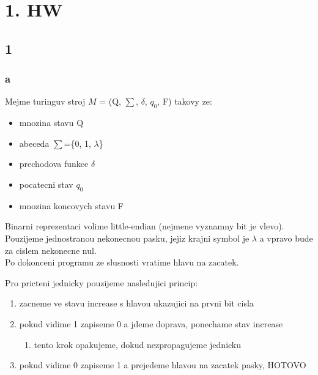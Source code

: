 \documentclass[a4paper]{article}
\begin{document}
\pagestyle{fancy}

\section*{1. HW}
\subsection*{1}
\subsubsection*{a}
Mejme turinguv stroj $M$ = (Q, $\sum$, $\delta$, $q_0$, F) takovy ze:
\begin{itemize}
    \item mnozina stavu Q
    \item abeceda $\sum$=\{0, 1, $\lambda$\}
    \item prechodova funkce $\delta$
    \item pocatecni stav $q_0$
    \item mnozina koncovych stavu F
\end{itemize}

Binarni reprezentaci volime little-endian (nejmene vyznamny bit je vlevo).\\
Pouzijeme jednostranou nekonecnou pasku, jejiz krajni symbol je $\lambda$ a vpravo bude za cislem nekonecne nul.\\
Po dokonceni programu ze slusnosti vratime hlavu na zacatek.

Pro pricteni jednicky pouzijeme nasledujici princip:
\begin{enumerate}
    \item zacneme ve stavu increase s hlavou ukazujici na prvni bit cisla
    \item pokud vidime 1 zapiseme 0 a jdeme doprava, ponechame stav increase
    \begin{enumerate}
        \item tento krok opakujeme, dokud nezpropagujeme jednicku
    \end{enumerate}
    \item pokud vidime 0 zapiseme 1 a prejedeme hlavou na zacatek pasky, HOTOVO
\end{enumerate}
\end{document}
